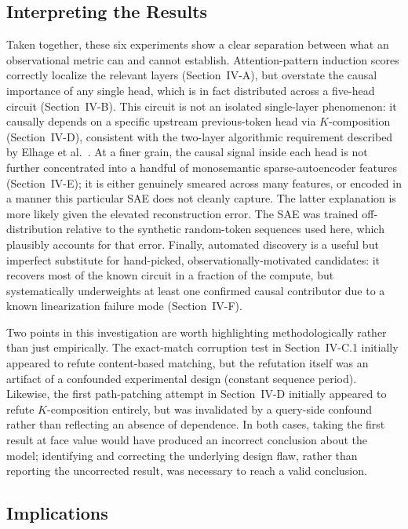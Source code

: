 \documentclass[conference]{IEEEtran}
\begin{document}
\subsection{Interpreting the Results}

Taken together, these six experiments show a clear separation between what an observational metric can and cannot establish. Attention-pattern induction scores correctly localize the relevant layers (Section~IV-A), but overstate the causal importance of any single head, which is in fact distributed across a five-head circuit (Section~IV-B). This circuit is not an isolated single-layer phenomenon: it causally depends on a specific upstream previous-token head via $K$-composition (Section~IV-D), consistent with the two-layer algorithmic requirement described by Elhage et al.~\cite{elhage2021}. At a finer grain, the causal signal inside each head is not further concentrated into a handful of monosemantic sparse-autoencoder features (Section~IV-E); it is either genuinely smeared across many features, or encoded in a manner this particular SAE does not cleanly capture. The latter explanation is more likely given the elevated reconstruction error. The SAE was trained off-distribution relative to the synthetic random-token sequences used here, which plausibly accounts for that error. Finally, automated discovery is a useful but imperfect substitute for hand-picked, observationally-motivated candidates: it recovers most of the known circuit in a fraction of the compute, but systematically underweights at least one confirmed causal contributor due to a known linearization failure mode (Section~IV-F).

Two points in this investigation are worth highlighting methodologically rather than just empirically. The exact-match corruption test in Section~IV-C.1 initially appeared to refute content-based matching, but the refutation itself was an artifact of a confounded experimental design (constant sequence period). Likewise, the first path-patching attempt in Section~IV-D initially appeared to refute $K$-composition entirely, but was invalidated by a query-side confound rather than reflecting an absence of dependence. In both cases, taking the first result at face value would have produced an incorrect conclusion about the model; identifying and correcting the underlying design flaw, rather than reporting the uncorrected result, was necessary to reach a valid conclusion.

\subsection{Implications}
\end{document}
